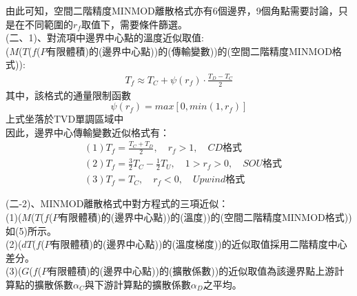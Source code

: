 \documentclass[12pt]{article}
\begin{document}
\vspace{0.7em}
{\centering
\noindent 由此可知，空間二階精度MINMOD離散格式亦有6個邊界，9個角點需要討論，只是在不同範圍的$r_{f}$取值下，需要條件篩選。\\
}
\vspace{0.6em}
\noindent (二、1)、對流項中邊界中心點的溫度近似取值:\\
\noindent ($M$($T$($f$($P$有限體積)的(邊界中心點))的(傳輸變數))的(空間二階精度MINMOD格式)):\\
\begin{equation}
    \begin{split}
        T_{f} \approx T_{C} + \psi(r_{f})
        \cdot \frac{T_{D}-T_{C}}{2}
    \end{split}
\end{equation}
\noindent 其中，該格式的通量限制函數$$\psi(r_{f}) = max[0,min(1,r_{f})]$$
{\centering
上式坐落於TVD單調區域中\\}
\vspace{0.6em}
\noindent 因此，邊界中心傳輸變數近似格式有：
\begin{equation}
\begin{split}
  &(1) T_{f} = \frac{T_{C} + T_{D}}{2} ,\quad r_{f} > 1  ,\quad CD\mbox{格式}\\
  &(2) T_{f} = \frac{3}{2}T_{C} - \frac{1}{2}T_{U} ,\quad  1 > r_{f} > 0 ,\quad SOU\mbox{格式}\\
  &(3) T_{f} = T_{C} ,\quad  r_{f} < 0 ,\quad Upwind\mbox{格式}
\end{split}
\end{equation}

\noindent (二-2)、MINMOD離散格式中對方程式的三項近似：\\

\noindent (1)($M$($T$($f$($P$有限體積)的(邊界中心點))的(溫度))的(空間二階精度MINMOD格式))如(5)所示。\\
\noindent (2)($dT$($f$($P$有限體積)的(邊界中心點))的(溫度梯度))的近似取值採用二階精度中心差分。\\
\noindent (3)($G$($f$($P$有限體積)的(邊界中心點))的(擴散係數))的近似取值為該邊界點上游計算點的擴散係數$\alpha_{C}$與下游計算點的擴散係數$\alpha_{D}$之平均。\\
\vspace{0.7em}
\end{document}
